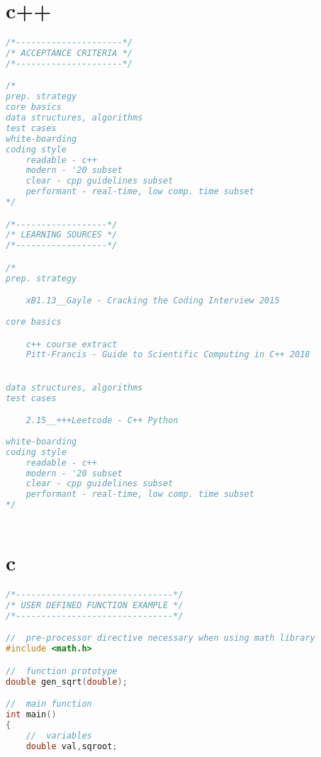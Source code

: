 \documentclass[8pt]{extarticle}
\begin{document}
\begin{small}
\begin{multicols}{2}
\begin{lstlisting}[language=C]
\end{lstlisting}

\vfill\null
\columnbreak

\section{c++}

\begin{lstlisting}[language=C]
/*---------------------*/
/* ACCEPTANCE CRITERIA */
/*---------------------*/

/*
prep. strategy
core basics
data structures, algorithms
test cases
white-boarding
coding style
	readable - c++
	modern - '20 subset
	clear - cpp guidelines subset
	performant - real-time, low comp. time subset
*/

/*------------------*/
/* LEARNING SOURCES */
/*------------------*/

/*
prep. strategy

	xB1.13__Gayle - Cracking the Coding Interview 2015
	
core basics

	c++ course extract
	Pitt-Francis - Guide to Scientific Computing in C++ 2018
	

data structures, algorithms
test cases

	2.15__+++Leetcode - C++ Python
	
white-boarding
coding style
	readable - c++
	modern - '20 subset
	clear - cpp guidelines subset
	performant - real-time, low comp. time subset
*/
		
\end{lstlisting}


\section{c}




\begin{lstlisting}[language=C]
/*-------------------------------*/
/* USER DEFINED FUNCTION EXAMPLE */
/*-------------------------------*/

//  pre-processor directive necessary when using math library
#include <math.h>

//  function prototype
double gen_sqrt(double);

//  main function
int main()
{
	//  variables
    double val,sqroot;
    

\end{lstlisting}
\end{multicols}
\end{small}
\end{document}
